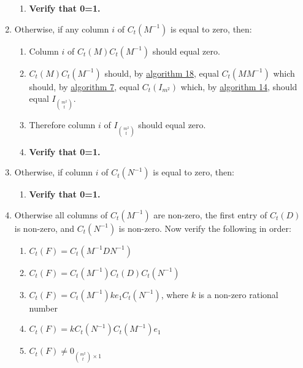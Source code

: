 \documentclass[twocolumn]{article}
\begin{document}
\begin{enumerate}
\begin{enumerate}
					\item \textbf{Verify that 0=1.}
				\end{enumerate}
				\item Otherwise, if any column $i$ of $C_t(M^{-1})$ is equal to zero, then:
				\begin{enumerate}
					\item Column $i$ of $C_t(M)C_t(M^{-1})$ should equal zero.
					\item $C_t(M)C_t(M^{-1})$ should, by \hyperref[sec:algorithm 18]{algorithm 18}, equal $C_t(MM^{-1})$ which should, by \hyperref[sec:algorithm 7]{algorithm 7}, equal $C_t(I_{m^2})$ which, by \hyperref[sec:algorithm 14]{algorithm 14}, should equal $I_{\binom{m^2}{t}}$.
					\item Therefore column $i$ of $I_{\binom{m^2}{t}}$ should equal zero.
					\item \textbf{Verify that 0=1.}
				\end{enumerate}
				\item Otherwise, if column $i$ of $C_t(N^{-1})$ is equal to zero, then:
				\begin{enumerate}
					\item \textbf{Verify that 0=1.}
				\end{enumerate}
				\item Otherwise all columns of $C_t(M^{-1})$ are non-zero, the first entry of $C_t(D)$ is non-zero, and $C_t(N^{-1})$ is non-zero. Now verify the following in order:
				\begin{enumerate}
					\item $C_t(F)=C_t(M^{-1}DN^{-1})$
					\item $C_t(F)=C_t(M^{-1})C_t(D)C_t(N^{-1})$
					\item $C_t(F)=C_t(M^{-1})ke_1C_t(N^{-1})$, where $k$ is a non-zero rational number
					\item $C_t(F)=kC_t(N^{-1})C_t(M^{-1})e_1$
					\item \textbf{$C_t(F)\ne 0_{\binom{m^2}{t}\times 1}$}
				\end{enumerate}
			\end{enumerate}
\end{document}
